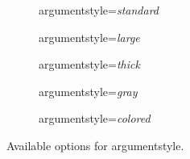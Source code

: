 \documentclass[headings=normal]{scrartcl}
\begin{document}
\begin{figure}[!h]
    \begin{subfigure}{0.32\textwidth}
        \centering
        \begin{af}[argumentstyle=standard]
    
            \label{af:test}
        \end{af}
        \caption{\textsf{argumentstyle}=\textit{standard}}
        \label{fig:argumentstyle_standard}
    \end{subfigure}
    \hfill
    \begin{subfigure}{0.3\textwidth}
        \centering
        \begin{af}[argumentstyle=large]
    
        \end{af}
        \caption{\textsf{argumentstyle}=\textit{large}}
        \label{fig:argumentstyle_large}
    \end{subfigure}
    \hfill
    \begin{subfigure}{0.3\textwidth}
        \centering
        \begin{af}[argumentstyle=thick]
    
        \end{af}
        \caption{\textsf{argumentstyle}=\textit{thick}}
        \label{fig:argumentstyle_thick}
    \end{subfigure}

    \par\bigskip

    \begin{subfigure}{0.49\textwidth}
        \centering
        \begin{af}[argumentstyle=gray]
    
        \end{af}
        \caption{\textsf{argumentstyle}=\textit{gray}}
        \label{fig:argumentstyle_gray}
    \end{subfigure}
    \hfill
    \begin{subfigure}{0.49\textwidth}
        \centering
        \begin{af}[argumentstyle=colored]
    
        \end{af}
        \caption{\textsf{argumentstyle}=\textit{colored}}
        \label{fig:argumentstyle_colored}
    \end{subfigure}
    
    \caption{Available options for \textsf{argumentstyle}.}
    \label{fig:argumentstyle}
\end{figure}
\end{document}
